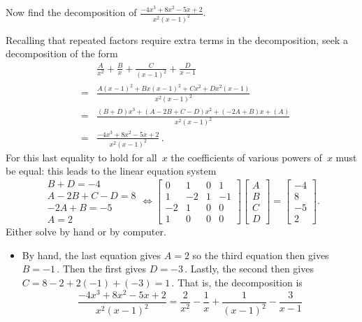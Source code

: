 \begin{OmitV1}
\begin{example}
Now find the  decomposition of \(\frac{-4x^3+8x^2-5x+2}{x^2(x-1)^2}\).
\begin{solution} 
Recalling that repeated factors require extra terms in the decomposition, seek a decomposition of the form
\begin{eqnarray*}&&
\frac A{x^2}+\frac B{x}+ \frac C{(x-1)^2} +\frac D{x-1}
\\&=&\frac{A(x-1)^2+Bx(x-1)^2 +Cx^2+ Dx^2(x-1)} {x^2(x-1)^2}
\\&=&\frac{(B+D)x^3+(A-2B+C-D)x^2+(-2A+B)x+(A)} {x^2(x-1)^2}
\\&=&\frac{-4x^3+8x^2-5x+2}{x^2(x-1)^2}\,.
\end{eqnarray*}
For this last equality to hold for all~\(x\) the coefficients of various powers of~\(x\) must be equal: this leads to the linear equation system
\begin{equation*}
\begin{array}{l}
B+D=-4 \\
A-2B+C-D=8 \\
-2A+B=-5\\
A=2
\end{array}
\iff
\begin{bmatrix} 0&1&0&1
\\1&-2&1&-1
\\-2&1&0&0
\\1&0&0&0 \end{bmatrix}\begin{bmatrix} A\\B\\C\\D \end{bmatrix}
=\begin{bmatrix} -4\\8\\-5\\2 \end{bmatrix}.
\end{equation*}
Either solve by hand or by computer.
\begin{itemize}
\item By hand, the last equation gives \(A=2\) so the third equation then gives \(B=-1\)\,.  
Then the first gives \(D=-3\)\,.  
Lastly, the second then gives \(C=8-2+2(-1)+(-3)=1\)\,.  
That is, the decomposition is
\begin{equation*}
\frac{-4x^3+8x^2-5x+2}{x^2(x-1)^2}
=\frac 2{x^2}-\frac 1{x}+ \frac 1{(x-1)^2} -\frac 3{x-1}
\end{equation*}


\end{itemize}
\end{solution}
\end{example}
\end{OmitV1}
